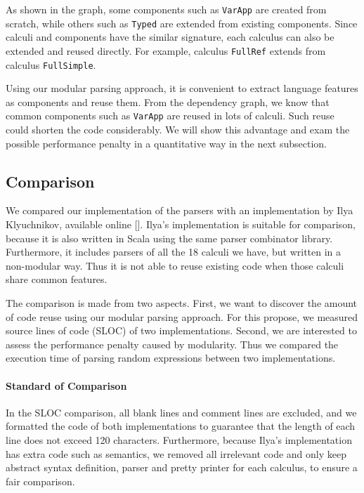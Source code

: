 As shown in the graph, some components such as \lstinline{VarApp} are
created from scratch, while others such as \lstinline{Typed} are
extended from existing components. Since calculi and components have the similar signature, each calculus
can also be extended and reused directly. For example, calculus \lstinline{FullRef} extends from
calculus \lstinline{FullSimple}.

Using our modular parsing approach, it is convenient to extract language
features as components and reuse them. From the dependency graph, we know
that common components such as \lstinline{VarApp} are reused in
lots of calculi. Such reuse could shorten the code considerably. We
will show this advantage and exam the possible performance penalty in
a quantitative way in the next subsection.

\subsection{Comparison}\label{subsec:cs-comparison}

We compared our implementation of the parsers with an implementation
by Ilya Klyuchnikov, available online []. Ilya's
implementation is suitable for comparison, because it is also
written in Scala using the same parser combinator library.
Furthermore, it includes parsers of all the 18 calculi we have, but
written in a non-modular way. Thus it is not able to reuse existing
code when those calculi share common features.

The comparison is made from two aspects. First, we want to discover
the amount of code reuse using our modular parsing approach.
For this propose, we measured source lines of code (SLOC) of two implementations.
Second, we are interested to assess the performance penalty caused by modularity.
Thus we compared the execution time of parsing random expressions between two implementations.

\paragraph{Standard of Comparison}
In the SLOC comparison, all blank lines and comment lines are excluded,
and we formatted the code of both implementations to guarantee that
the length of each line does not exceed 120 characters. Furthermore,
because Ilya's implementation has extra code such as semantics,
we removed all irrelevant code and only keep abstract
syntax definition, parser and pretty printer for each calculus, to
ensure a fair comparison.

